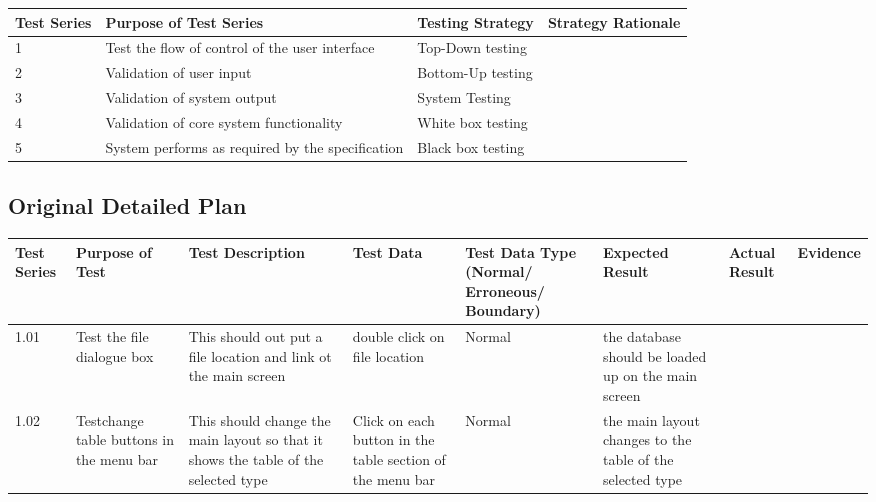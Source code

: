 \begin{landscape}
\begin{center}
    \begin{tabular}{|p{2cm}|p{5cm}|p{5cm}|p{4cm}|}
        \hline
        \textbf{Test Series} & \textbf{Purpose of Test Series} & \textbf{Testing Strategy} & \textbf{Strategy Rationale}\\ \hline
        1 & Test the flow of control of the user interface  & Top-Down testing &  \\ \hline
        2 & Validation of user input & Bottom-Up testing &  \\ \hline
        3 & Validation of system output & System Testing & \\ \hline
        4 & Validation of core system functionality & White box testing & \\ \hline
        5 & System performs as required by the specification & Black box testing & \\ \hline
    \end{tabular}
\end{center}
\subsection{Original Detailed Plan}

\begin{center}
    \begin{longtable}{|p{1.5cm}|p{2.5cm}|p{2.5cm}|p{2cm}|p{2cm}|p{2cm}|p{2cm}|p{2cm}|}
        \hline
        \textbf{Test Series} & \textbf{Purpose of Test} & \textbf{Test Description} & \textbf{Test Data} & \textbf{Test Data Type (Normal/ Erroneous/ Boundary)} & \textbf{Expected Result} & \textbf{Actual Result} & \textbf{Evidence}\\ \hline
        1.01 & Test the file dialogue box & This should out put a file location and link ot the main screen & double click on file location & Normal & the database should be loaded up on the main screen &  &  \\ \hline
        
        1.02 & Testchange table buttons in the menu bar  & This should change the main layout so that it shows the table of the selected type & Click on each button in the table section of the menu bar & Normal & the main layout changes to the table of the selected type & & \\ \hline
        

\end{longtable}
\end{center}
\end{landscape}
